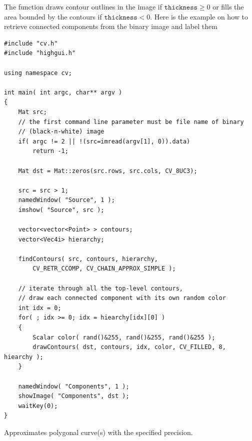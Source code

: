 The function draws contour outlines in the image if $\texttt{thickness} \ge 0$ or fills the area bounded by the contours if $ \texttt{thickness}<0$. Here is the example on how to retrieve connected components from the binary image and label them

\begin{lstlisting}
#include "cv.h"
#include "highgui.h"

using namespace cv;

int main( int argc, char** argv )
{
    Mat src;
    // the first command line parameter must be file name of binary 
    // (black-n-white) image
    if( argc != 2 || !(src=imread(argv[1], 0)).data)
        return -1;

    Mat dst = Mat::zeros(src.rows, src.cols, CV_8UC3);

    src = src > 1;
    namedWindow( "Source", 1 );
    imshow( "Source", src );

    vector<vector<Point> > contours;
    vector<Vec4i> hierarchy;
    
    findContours( src, contours, hierarchy, 
        CV_RETR_CCOMP, CV_CHAIN_APPROX_SIMPLE );

    // iterate through all the top-level contours,
    // draw each connected component with its own random color
    int idx = 0;
    for( ; idx >= 0; idx = hiearchy[idx][0] )
    {
        Scalar color( rand()&255, rand()&255, rand()&255 );
        drawContours( dst, contours, idx, color, CV_FILLED, 8, hiearchy );
    }

    namedWindow( "Components", 1 );
    showImage( "Components", dst );
    waitKey(0);
}
\end{lstlisting}


Approximates polygonal curve(s) with the specified precision.

\begin{description}
\end{description}

